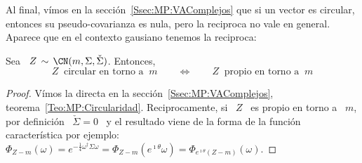 Al final, v\'imos en la  secci\'on~\ref{Ssec:MP:VAComplejos} que si un vector es
circular, entonces  su pseudo-covarianza es nula,  pero la reciproca  no vale en
general. Aparece que en el contexto gausiano tenemos la reciproca:
%

\begin{teorema}[Circularidad]\label{Teo:MP:CircularidadGaussiana}
%
Sea \ $Z \, \sim \, \CN(m,\Sigma,\check{\Sigma})$.  Entonces,
  \[
  Z \: \mbox{ circular  en torno a } \: m \qquad  \Longleftrightarrow \qquad Z \:
\mbox{ propio en torno a } \: m
  \]
\end{teorema}
%
\begin{proof}
  V\'imos     la    directa    en     la    secci\'on~\ref{Ssec:MP:VAComplejos},
  teorema~\ref{Teo:MP:Circularidad}.  Reciprocamente,  si \  $Z$ \ es  propio en
  torno a \ $m$, por definici\'on \ $\check{\Sigma} = 0$ \ y el resultado viene
  de la forma de  la funci\'on caracter\'istica por ejemplo: $\Phi_{Z-m}(\omega)
  = e^{-\frac14 \omega^\dag \Sigma \omega } = \Phi_{Z-m}\left( e^{\imath \theta}
    \omega \right) = \Phi_{e^{\imath \theta} (Z-m)}(\omega)$.
\end{proof}


